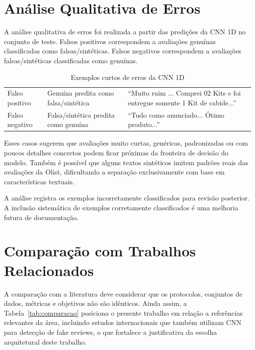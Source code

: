 \documentclass[12pt,a4paper]{article}
\begin{document}
\section{Análise Qualitativa de Erros}

A análise qualitativa de erros foi realizada a partir das predições da CNN 1D no conjunto de teste. Falsos positivos correspondem a avaliações genuínas classificadas como falsas/sintéticas. Falsos negativos correspondem a avaliações falsas/sintéticas classificadas como genuínas.

\begin{table}[H]
\centering
\renewcommand{\arraystretch}{1.25}
\caption{Exemplos curtos de erros da CNN 1D}
\label{tab:erros}
\begin{tabularx}{\textwidth}{@{} l L{4cm} Y @{}}
\toprule
{} &  &  \\
\midrule
Falso positivo & Genuína predita como falsa/sintética & ``Muito ruim ... Comprei 02 Kits e foi entregue somente 1 Kit de cabide...'' \\
\addlinespace
Falso negativo & Falsa/sintética predita como genuína & ``Tudo como anunciado... Ótimo produto...'' \\
\bottomrule
\end{tabularx}
\end{table}

Esses casos sugerem que avaliações muito curtas, genéricas, padronizadas ou com poucos detalhes concretos podem ficar próximas da fronteira de decisão do modelo. Também é possível que alguns textos sintéticos imitem padrões reais das avaliações da Olist, dificultando a separação exclusivamente com base em características textuais.

A análise registra os exemplos incorretamente classificados para revisão posterior. A inclusão sistemática de exemplos corretamente classificados é uma melhoria futura de documentação.

\section{Comparação com Trabalhos Relacionados}

A comparação com a literatura deve considerar que os protocolos, conjuntos de dados, métricas e objetivos não são idênticos. Ainda assim, a Tabela~\ref{tab:comparacao} posiciona o presente trabalho em relação a referências relevantes da área, incluindo estudos internacionais que também utilizam CNN para detecção de fake reviews, o que fortalece a justificativa da escolha arquitetural deste trabalho.
\end{document}
